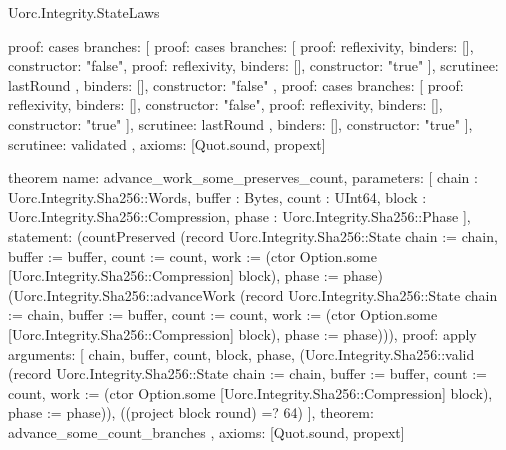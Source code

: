 \begin{lexlean}{Uorc.Integrity.StateLaws}
\begin{semanticmodule}
{  proof: cases{
    branches: [
      {
        proof: cases{
          branches: [
            {proof: reflexivity{}, binders: [], constructor: "false"},
            {proof: reflexivity{}, binders: [], constructor: "true"}
          ],
          scrutinee: lastRound
        },
        binders: [],
        constructor: "false"
      },
      {
        proof: cases{
          branches: [
            {proof: reflexivity{}, binders: [], constructor: "false"},
            {proof: reflexivity{}, binders: [], constructor: "true"}
          ],
          scrutinee: lastRound
        },
        binders: [],
        constructor: "true"
      }
    ],
    scrutinee: validated
  },
  axioms: [Quot.sound, propext]
}

theorem{
  name: advance_work_some_preserves_count,
  parameters: [
    chain : Uorc.Integrity.Sha256::Words,
    buffer : Bytes,
    count : UInt64,
    block : Uorc.Integrity.Sha256::Compression,
    phase : Uorc.Integrity.Sha256::Phase
  ],
  statement: (countPreserved (record Uorc.Integrity.Sha256::State {chain := chain, buffer := buffer, count := count, work := (ctor Option.some [Uorc.Integrity.Sha256::Compression] block), phase := phase}) (Uorc.Integrity.Sha256::advanceWork (record Uorc.Integrity.Sha256::State {chain := chain, buffer := buffer, count := count, work := (ctor Option.some [Uorc.Integrity.Sha256::Compression] block), phase := phase}))),
  proof: apply{
    arguments: [
      chain,
      buffer,
      count,
      block,
      phase,
      (Uorc.Integrity.Sha256::valid (record Uorc.Integrity.Sha256::State {chain := chain, buffer := buffer, count := count, work := (ctor Option.some [Uorc.Integrity.Sha256::Compression] block), phase := phase})),
      ((project block round) =? 64)
    ],
    theorem: advance_some_count_branches
  },
  axioms: [Quot.sound, propext]
}


\end{semanticmodule}
\end{lexlean}
